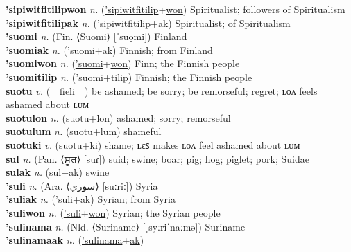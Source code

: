 \textbf{'sipiwitfitilipwon} \textit{n.} (\hyperref['sipiwitfitilip]{'sipiwitfitilip}+\hyperref[won]{won})
Spiritualist; followers of Spiritualism \label{'sipiwitfitilipwon} \\
\textbf{'sipiwitfitilipak} \textit{n.} (\hyperref['sipiwitfitilip]{'sipiwitfitilip}+\hyperref[ak]{ak})
Spiritualist; of Spiritualism \label{'sipiwitfitilipak} \\
\textbf{'suomi} \textit{n.} (Fin. ⟨Suomi⟩ [ˈsuo̯mi])
Finland \label{'suomi} \\
\textbf{'suomiak} \textit{n.} (\hyperref['suomi]{'suomi}+\hyperref[ak]{ak})
Finnish; from Finland \label{'suomiak} \\
\textbf{'suomiwon} \textit{n.} (\hyperref['suomi]{'suomi}+\hyperref[won]{won})
Finn; the Finnish people \label{'suomiwon} \\
\textbf{'suomitilip} \textit{n.} (\hyperref['suomi]{'suomi}+\hyperref[tilip]{tilip})
Finnish; the Finnish people \label{'suomitilip} \\
\textbf{suotu} \textit{v.} (\hyperref[fieli]{~~fieli~~})
be ashamed; be sorry; be remorseful; regret; \hyperref[suotulon]{ʟᴏᴧ} feels ashamed about \hyperref[suotulum]{ʟᴜᴍ} \label{suotu} \\
\textbf{suotulon} \textit{n.} (\hyperref[suotu]{suotu}+\hyperref[lon]{lon})
ashamed; sorry; remorseful \label{suotulon} \\
\textbf{suotulum} \textit{n.} (\hyperref[suotu]{suotu}+\hyperref[lum]{lum})
shameful \label{suotulum} \\
\textbf{suotuki} \textit{v.} (\hyperref[suotu]{suotu}+\hyperref[ki]{ki})
shame; ʟєꜱ makes ʟᴏᴧ feel ashamed about ʟᴜᴍ \label{suotuki} \\
\textbf{sul} \textit{n.} (Pan. ⟨ਸੂਰ⟩ [suɾ])
suid; swine; boar; pig; hog; piglet; pork; Suidae \label{sul} \\
\textbf{sulak} \textit{n.} (\hyperref[sul]{sul}+\hyperref[ak]{ak})
swine \label{sulak} \\
\textbf{'suli} \textit{n.} (Ara. ⟨سوري‎⟩ [suːriː])
Syria \label{'suli} \\
\textbf{'suliak} \textit{n.} (\hyperref['suli]{'suli}+\hyperref[ak]{ak})
Syrian; from Syria \label{'suliak} \\
\textbf{'suliwon} \textit{n.} (\hyperref['suli]{'suli}+\hyperref[won]{won})
Syrian; the Syrian people \label{'suliwon} \\
\textbf{'sulinama} \textit{n.} (Nld. ⟨Suriname⟩ [ˌsyːriˈnaːmə])
Suriname \label{'sulinama} \\
\textbf{'sulinamaak} \textit{n.} (\hyperref['sulinama]{'sulinama}+\hyperref[ak]{ak})
